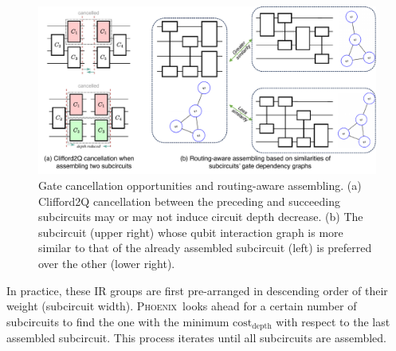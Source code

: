 \documentclass[conference,9pt]{IEEEtran}
\newcommand{\phoenix}{\textsc{Phoenix}}
\begin{document}
    \begin{figure}[tbp]
        \centering
        \includegraphics[width=\columnwidth]{figures/gate_cancel.pdf}
        \caption{Gate cancellation opportunities and routing-aware assembling.  (a) Clifford2Q cancellation between the preceding and succeeding subcircuits may or may not induce circuit depth decrease.  (b) The subcircuit (upper right) whose qubit interaction graph is more similar to that of the already assembled subcircuit (left) is preferred over the other (lower right).}
        \label{fig:gate-cancel}
    \end{figure}

    In practice, these IR groups are first pre-arranged in descending order of their weight (subcircuit width). \phoenix\ looks ahead for a certain number of subcircuits to find the one with the minimum $\mathrm{cost}_\mathrm{depth}$ with respect to the last assembled subcircuit. This process iterates until all subcircuits are assembled. %
    
\end{document}
